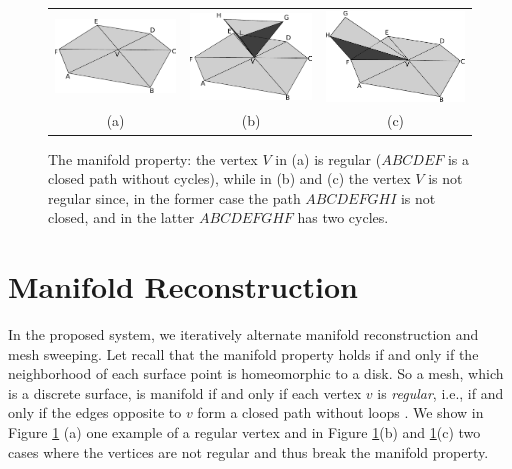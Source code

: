 \begin{figure}[t]
\centering
\begin{tabular}{ccc}
\includegraphics[width=0.28\columnwidth]{./img/manifold}&
\includegraphics[width=0.28\columnwidth]{./img/notmanifold1}&
\includegraphics[width=0.28\columnwidth]{./img/notmanifold2}\\
(a)&(b)&(c)
\end{tabular}
\caption{The manifold property: the vertex $V$ in (a) is regular ($ABCDEF$ is a closed path without cycles), while in (b) and (c) the vertex $V$ is not regular since, in the former case the path $ABCDEFGHI$ is not closed, and in the latter $ABCDEFGHF$ has two cycles.}
\label{fig:vertexManifold}
\end{figure}


\section{Manifold Reconstruction}
\label{sec:manifold}
In the proposed system, we iteratively alternate manifold reconstruction and mesh sweeping.
Let recall that the manifold property holds if and only if the neighborhood of each surface point is homeomorphic to a disk. 
So a mesh, which is a discrete surface, is manifold if and only if each vertex $v$ is \emph{regular}, i.e., if and only if the edges opposite to $v$ form a closed path without loops  \cite{Litvinov_Lhuillier_13}. 
We show in Figure \ref{fig:vertexManifold} (a) one example of a regular vertex and in Figure \ref{fig:vertexManifold}(b) and \ref{fig:vertexManifold}(c) two cases where the vertices are not regular and thus break the manifold property.

